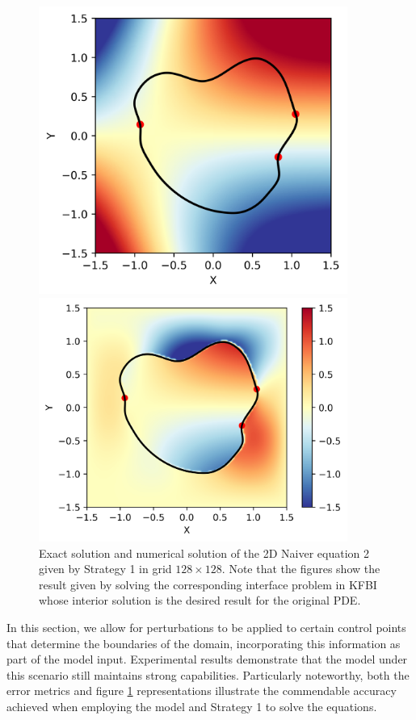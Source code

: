 \documentclass{article}
\begin{document}
\begin{figure}[htb]
\begin{minipage}[t]{0.22\textwidth}
\centering
\includegraphics[width=0.9\textwidth]{CP_exact_2.png}
\end{minipage}
\begin{minipage}[t]{0.257\textwidth}
\centering
\includegraphics[width=0.9\textwidth]{CP_v2.png}
\end{minipage}
\caption{Exact solution and numerical solution of the 2D Naiver equation 2 given by Strategy 1 in grid $128 \times 128$. Note that the figures show the result given by solving the corresponding interface problem in KFBI whose interior solution is the desired result for the original PDE.}
\label{fig:new_naiver}
\end{figure}
In this section, we allow for perturbations to be applied to certain control points that determine the boundaries of the domain, incorporating this information as part of the model input. Experimental results demonstrate that the model under this scenario still maintains strong capabilities. Particularly noteworthy, both the error metrics and figure \ref{fig:new_naiver} representations illustrate the commendable accuracy achieved when employing the model and Strategy 1 to solve the equations.
\end{document}
